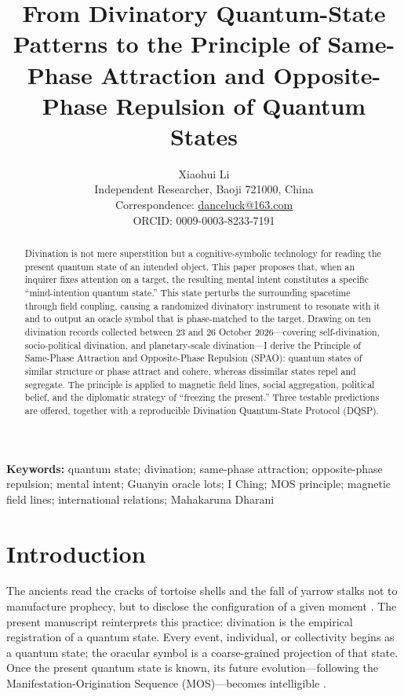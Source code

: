 \documentclass[11pt,a4paper]{article}
\title{\textbf{From Divinatory Quantum-State Patterns to the Principle of Same-Phase Attraction and Opposite-Phase Repulsion of Quantum States}}
\author{
  Xiaohui Li\\
  \small Independent Researcher, Baoji 721000, China\\
  \small Correspondence: \href{mailto:danceluck@163.com}{danceluck@163.com}\\
  \small ORCID: 0009-0003-8233-7191
}
\date{}
\begin{document}
\maketitle
\thispagestyle{fancy}


\begin{abstract}
\noindent
Divination is not mere superstition but a cognitive-symbolic technology for reading the present quantum state of an intended object. This paper proposes that, when an inquirer fixes attention on a target, the resulting mental intent constitutes a specific ``mind-intention quantum state.'' This state perturbs the surrounding spacetime through field coupling, causing a randomized divinatory instrument to resonate with it and to output an oracle symbol that is phase-matched to the target. Drawing on ten divination records collected between 23 and 26 October 2026---covering self-divination, socio-political divination, and planetary-scale divination---I derive the Principle of Same-Phase Attraction and Opposite-Phase Repulsion (SPAO): quantum states of similar structure or phase attract and cohere, whereas dissimilar states repel and segregate. The principle is applied to magnetic field lines, social aggregation, political belief, and the diplomatic strategy of ``freezing the present.'' Three testable predictions are offered, together with a reproducible Divination Quantum-State Protocol (DQSP).
\end{abstract}

\vspace{0.5em}
\noindent\textbf{Keywords:} quantum state; divination; same-phase attraction; opposite-phase repulsion; mental intent; Guanyin oracle lots; I Ching; MOS principle; magnetic field lines; international relations; Mahakaruna Dharani


\section{Introduction}

The ancients read the cracks of tortoise shells and the fall of yarrow stalks not to manufacture prophecy, but to disclose the configuration of a given moment \cite{Li2026,IChing}. The present manuscript reinterprets this practice: divination is the empirical registration of a quantum state. Every event, individual, or collectivity begins as a quantum state; the oracular symbol is a coarse-grained projection of that state. Once the present quantum state is known, its future evolution---following the Manifestation-Origination Sequence (MOS)---becomes intelligible \cite{Li2026}.
\end{document}

